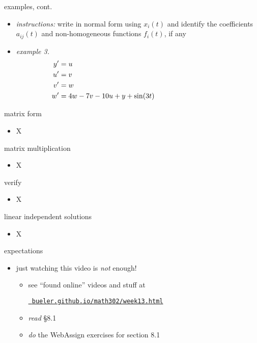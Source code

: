 \documentclass[urlcolor=blue,dvipsnames]{beamer}
\begin{document}
\begin{frame}{examples, cont.}

\small
\begin{itemize}
\item \emph{instructions:} write in normal form using $x_i(t)$ and identify the coefficients $a_{ij}(t)$ and non-homogeneous functions $f_i(t)$, if any
\item \emph{example 3.}
\begin{align*}
y' &= u \hspace{75mm} \\
u' &= v \\
v' &= w \\
w' &= 4w-7v-10u+y+\sin(3t)
\end{align*}
\end{itemize}

\vspace{40mm}
\end{frame}


\begin{frame}{matrix form}

\begin{itemize}
\item X
\end{itemize}
\end{frame}


\begin{frame}{matrix multiplication}

\begin{itemize}
\item X
\end{itemize}
\end{frame}


\begin{frame}{verify}

\begin{itemize}
\item X
\end{itemize}
\end{frame}


\begin{frame}{linear independent solutions}

\begin{itemize}
\item X
\end{itemize}
\end{frame}


\begin{frame}{expectations}

\begin{itemize}
\item just watching this video is \emph{not} enough!
     \begin{itemize}
     \item see ``found online'' videos and stuff at

     \centerline{\href{https://bueler.github.io/math302/week13.html}{\tt \color{cyan} bueler.github.io/math302/week13.html}}
     \item \emph{read} \S8.1
     \item \emph{do} the WebAssign exercises for section 8.1
     \end{itemize}
\end{itemize}
\end{frame}
\end{document}
